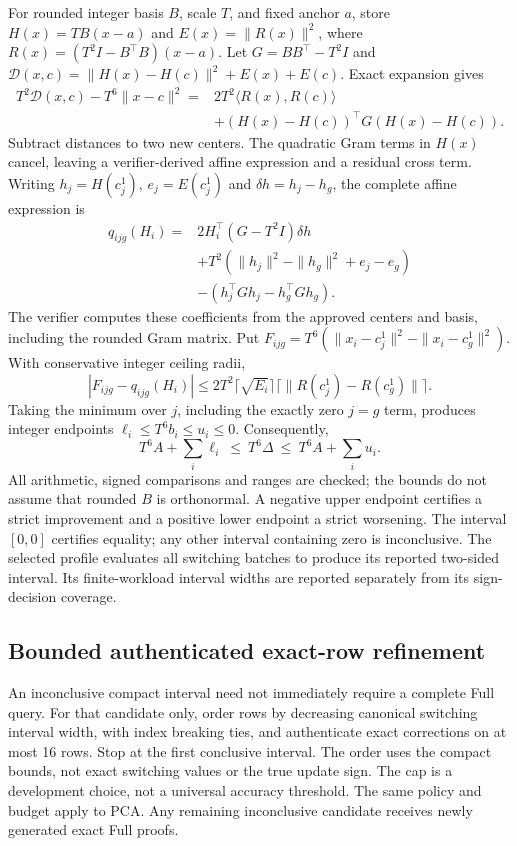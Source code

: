 For rounded integer basis $B$, scale $T$, and fixed anchor $a$, store
$H(x)=TB(x-a)$ and $E(x)=\|R(x)\|^2$, where
$R(x)=(T^2I-B^\top B)(x-a)$. Let $G=BB^\top-T^2I$ and
$\mathcal D(x,c)=\|H(x)-H(c)\|^2+E(x)+E(c)$. Exact expansion gives
\begin{align}
 T^2\mathcal D(x,c)-T^6\|x-c\|^2
 ={}&2T^2\langle R(x),R(c)\rangle\nonumber\\
 &+(H(x)-H(c))^\top G(H(x)-H(c)).
\end{align}
Subtract distances to two new centers. The quadratic Gram terms in $H(x)$
cancel, leaving a verifier-derived affine expression and a residual cross
term. Writing $h_j=H(c^1_j)$, $e_j=E(c^1_j)$ and
$\delta h=h_j-h_g$, the complete affine expression is
\begin{align}\label{eq:explicit-affine}
 q_{ijg}(H_i)={}&2H_i^\top(G-T^2I)\delta h\nonumber\\
 &+T^2(\|h_j\|^2-\|h_g\|^2+e_j-e_g)\nonumber\\
 &-(h_j^\top Gh_j-h_g^\top Gh_g).
\end{align}
The verifier computes these coefficients from the approved centers and basis,
including the rounded Gram matrix. Put
$F_{ijg}=T^6(\|x_i-c^1_j\|^2-\|x_i-c^1_g\|^2)$.
With conservative integer ceiling radii,
\begin{equation}
 \left|F_{ijg}-q_{ijg}(H_i)\right|
 \le 2T^2\lceil\sqrt{E_i}\rceil
       \lceil\|R(c^1_j)-R(c^1_g)\|\rceil.
\end{equation}
Taking the minimum over $j$, including the exactly zero $j=g$ term, produces
integer endpoints $\ell_i\le T^6b_i\le u_i\le 0$. Consequently,
\begin{equation}\label{eq:group-envelope}
 T^6A+\sum_i\ell_i\ \le\ T^6\Delta\ \le\ T^6A+\sum_i u_i.
\end{equation}
All arithmetic, signed comparisons and ranges are checked; the bounds do not
assume that rounded $B$ is orthonormal. A negative upper endpoint certifies a
strict improvement and a positive lower endpoint a strict worsening.
The interval $[0,0]$ certifies equality; any other interval containing zero
is inconclusive. The selected profile evaluates all switching batches to
produce its reported two-sided interval. Its finite-workload interval widths
are reported separately from its sign-decision coverage.

\subsection{Bounded authenticated exact-row refinement}\label{sec:refinement}
An inconclusive compact interval need not immediately require a complete Full
query. For that candidate only, order rows by decreasing canonical switching
interval width, with index breaking ties, and authenticate exact corrections
on at most 16 rows. Stop at the first conclusive interval. The order uses the
compact bounds, not exact switching values or the true update sign. The cap
is a development choice, not a universal accuracy threshold. The same policy
and budget apply to PCA. Any remaining inconclusive candidate receives newly
generated exact Full proofs.

